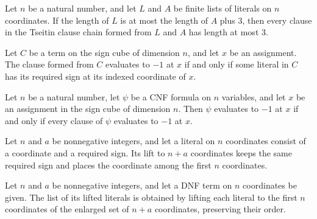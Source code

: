 \begin{theorem}
\label{FABL.length_le_three_of_mem_tseitinClauseChain}
\leanok
{}
Let $n$ be a natural number, and let $L$ and $A$ be finite lists of literals on $n$
coordinates. If the length of $L$ is at most the length of $A$ plus $3$, then every
clause in the Tseitin clause chain formed from $L$ and $A$ has length at most $3$.
\end{theorem}

\begin{theorem}
\label{FABL.CNFFormula.clauseEval_eq_neg_one_iff}
\leanok
{}
Let $C$ be a term on the sign cube of dimension $n$, and let $x$ be an assignment. The
clause formed from $C$ evaluates to $-1$ at $x$ if and only if some literal in $C$ has
its required sign at its indexed coordinate of $x$.
\end{theorem}

\begin{theorem}
\label{FABL.CNFFormula.eval_eq_neg_one_iff}
\leanok
{}
Let $n$ be a natural number, let $\psi$ be a CNF formula on $n$ variables, and let $x$
be an assignment in the sign cube of dimension $n$. Then $\psi$ evaluates to $-1$ at $x$
if and only if every clause of $\psi$ evaluates to $-1$ at $x$.
\end{theorem}

\begin{definition}
\label{FABL.tseitinLiftLiteral}
\leanok
{}
Let $n$ and $a$ be nonnegative integers, and let a literal on $n$ coordinates consist of
a coordinate and a required sign. Its lift to $n+a$ coordinates keeps the same required
sign and places the coordinate among the first $n$ coordinates.
\end{definition}

\begin{definition}
\label{FABL.tseitinLiftLiterals}
\leanok
{}
Let $n$ and $a$ be nonnegative integers, and let a DNF term on $n$ coordinates be given.
The list of its lifted literals is obtained by lifting each literal to the first $n$
coordinates of the enlarged set of $n+a$ coordinates, preserving their order.
\end{definition}


